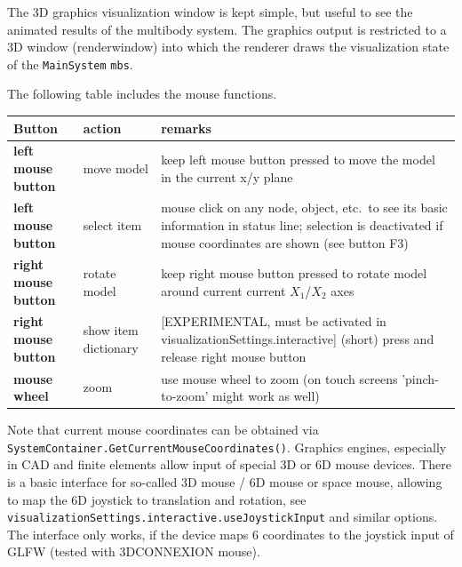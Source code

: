 %
%
The 3D graphics visualization window is kept simple, but useful to see the animated results of the multibody system.
The graphics output is restricted to a 3D window (renderwindow) into which the renderer draws the visualization state of the \texttt{MainSystem} \texttt{mbs}.

The following table includes the mouse functions. 

\begin{center}
  \footnotesize
  \begin{longtable}{| p{4cm} | p{4cm} | p{8cm} |} 
	\hline
  \bf Button & action & \bf remarks \\ \hline
  \bf left mouse button & move model & keep left mouse button pressed to move the model in the current x/y plane\\ \hline
  \bf left mouse button & select item & mouse click on any node, object, etc.\ to see its basic information in status line; selection is deactivated if mouse coordinates are shown (see button F3) \\ \hline
  \bf right mouse button & rotate model & keep right mouse button pressed to rotate model around current current $X_1$/$X_2$ axes\\
	\bf right mouse button & show item dictionary & [EXPERIMENTAL, must be activated in visualizationSettings.interactive] (short) press and release right mouse button \\ \hline
\hline
  \bf mouse wheel & zoom & use mouse wheel to zoom (on touch screens 'pinch-to-zoom' might work as well) \\ \hline
  \end{longtable}
\end{center}
Note that current mouse coordinates can be obtained via \texttt{SystemContainer.GetCurrentMouseCoordinates()}.
%
Graphics engines, especially in CAD and finite elements allow input of special 3D or 6D mouse devices.
There is a basic interface for so-called 3D mouse / 6D mouse or space mouse, allowing to map the 6D joystick to translation and rotation,
see \texttt{visualizationSettings.interactive.useJoystickInput} and similar options.
The interface only works, if the device maps 6 coordinates to the joystick input of GLFW (tested with 3DCONNEXION mouse).


